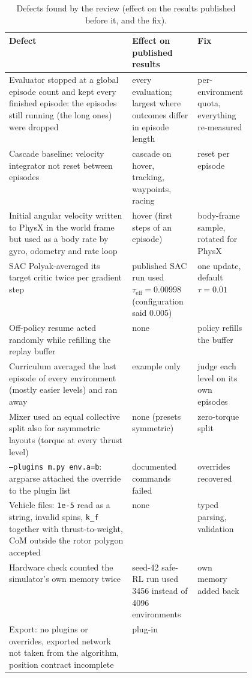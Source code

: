 \begin{table}[!htbp]\centering\small
\caption{Defects found by the review (effect on the results published before it, and the fix).}\label{tab:review}
\begin{tabularx}{\linewidth}{>{\raggedright\arraybackslash}X>{\raggedright\arraybackslash}p{0.27\linewidth}>{\raggedright\arraybackslash}p{0.2\linewidth}}\toprule
Defect & Effect on published results & Fix\\\midrule
Evaluator stopped at a global episode count and kept every finished episode: the episodes still running (the long
ones) were dropped & every evaluation; largest where outcomes differ in episode length & per-environment quota,
everything re-measured\\
Cascade baseline: velocity integrator not reset between episodes & cascade on hover, tracking, waypoints, racing &
reset per episode\\
Initial angular velocity written to PhysX in the world frame but used as a body rate by gyro, odometry and rate loop &
hover (first steps of an episode) & body-frame sample, rotated for PhysX\\
SAC Polyak-averaged its target critic twice per gradient step & published SAC run used $\tau_\text{eff}=0.00998$
(configuration said 0.005) & one update, default $\tau=0.01$\\
Off-policy resume acted randomly while refilling the replay buffer & none & policy refills the buffer\\
Curriculum averaged the last episode of every environment (mostly easier levels) and ran away & example only & judge
each level on its own episodes\\
Mixer used an equal collective split also for asymmetric layouts (torque at every thrust level) & none (presets
symmetric) & zero-torque split\\
\texttt{--plugins m.py env.a=b}: argparse attached the override to the plugin list & documented commands failed &
overrides recovered\\
Vehicle files: \texttt{1e-5} read as a string, invalid spins, \texttt{k\_f} together with thrust-to-weight, CoM
outside the rotor polygon accepted & none & typed parsing, validation\\
Hardware check counted the simulator's own memory twice & seed-42 safe-RL run used 3456 instead of 4096 environments &
own memory added back\\
Export: no plugins or overrides, exported network not taken from the algorithm, position contract incomplete & plug-in

\end{tabularx}
\end{table}
